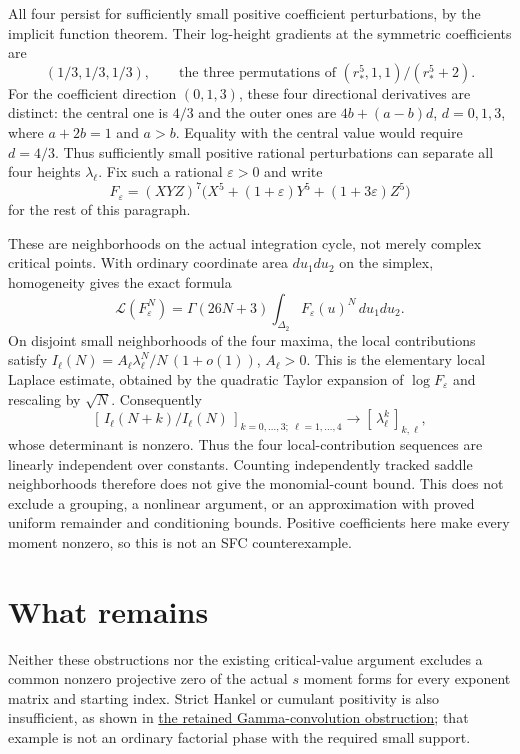 \documentclass[11pt]{article}
\newcommand{\Lfac}{\mathcal L}
\begin{document}
All four persist for sufficiently small positive coefficient
perturbations, by the implicit function theorem. Their log-height
gradients at the symmetric coefficients are
\[
 (1/3,1/3,1/3),\qquad
 \text{the three permutations of }(r_*^5,1,1)/(r_*^5+2).
\]
For the coefficient direction $(0,1,3)$, these four directional
derivatives are distinct: the central one is $4/3$ and the outer ones
are $4b+(a-b)d$, $d=0,1,3$, where $a+2b=1$ and $a>b$.
Equality with the central value would require $d=4/3$.
Thus sufficiently small positive rational perturbations can separate
all four heights $\lambda_\ell$. Fix such a rational $\varepsilon>0$ and
write
\[
 F_\varepsilon=(XYZ)^7
       \bigl(X^5+(1+\varepsilon)Y^5+(1+3\varepsilon)Z^5\bigr)
\]
for the rest of this paragraph.

These are neighborhoods on the actual integration cycle, not merely
complex critical points. With ordinary coordinate area $du_1du_2$
on the simplex, homogeneity gives the exact formula
\[
 \Lfac(F_\varepsilon^N)=\Gamma(26N+3)
             \int_{\Delta_2}F_\varepsilon(u)^N\,du_1du_2.
\]
On disjoint small neighborhoods of the four maxima, the local
contributions satisfy
$I_\ell(N)=A_\ell\lambda_\ell^N/N\,(1+o(1))$, $A_\ell>0$.
This is the elementary local Laplace estimate, obtained by the
quadratic Taylor expansion of $\log F_\varepsilon$ and rescaling by
$\sqrt N$.
Consequently
\[
 [\,I_\ell(N+k)/I_\ell(N)\,]_{k=0,\ldots,3;\ \ell=1,\ldots,4}
 \longrightarrow [\,\lambda_\ell^k\,]_{k,\ell},
\]
whose determinant is nonzero. Thus the four local-contribution
sequences are linearly independent over constants. Counting independently
tracked saddle neighborhoods therefore does not give the monomial-count
bound. This does not exclude a grouping, a nonlinear argument, or an
approximation with proved uniform
remainder and conditioning bounds. Positive coefficients here make
every moment nonzero, so this is not an SFC counterexample.

\section{What remains}
Neither these obstructions nor the existing critical-value argument
excludes a common nonzero projective zero of the actual $s$ moment
forms for every exponent matrix and starting index.
Strict Hankel or cumulant positivity is also insufficient, as shown in
\href{GAMMA_CONVOLUTION_APPELL_OBSTRUCTION.tex}{the retained
Gamma-convolution obstruction}; that example is not an ordinary
factorial phase with the required small support.
\end{document}
